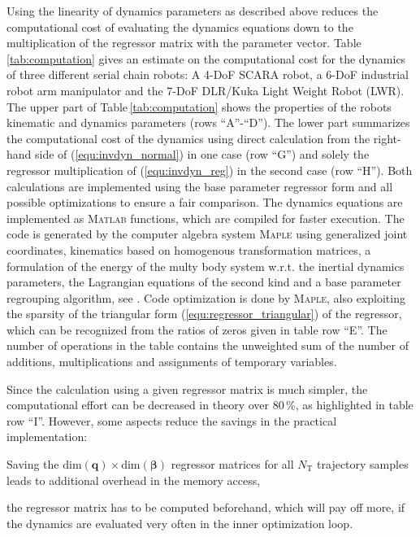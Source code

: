 \documentclass{svproc}
\newcommand{\bm}[1]{\boldsymbol{#1}}
\begin{document}
Using the linearity of dynamics parameters as described above reduces the computational cost of evaluating the dynamics equations down to the multiplication of the regressor matrix with the parameter vector.
Table\,\ref{tab:computation} gives an estimate on the computational cost for the dynamics of three different serial chain robots: A 4-DoF SCARA robot, a 6-DoF industrial robot arm manipulator and the 7-DoF DLR/Kuka Light Weight Robot (LWR).
The upper part of Table\,\ref{tab:computation} shows the properties of the robots kinematic and dynamics parameters (rows ``A''-``D'').
The lower part summarizes the computational cost of the dynamics using direct calculation from the right-hand side of (\ref{equ:invdyn_normal}) in one case (row ``G'') and solely the regressor multiplication of (\ref{equ:invdyn_reg}) in the second case (row ``H'').
Both calculations are implemented using the base parameter regressor form and all possible optimizations to ensure a fair comparison.
The dynamics equations are implemented as \textsc{Matlab} functions, which are compiled for faster execution.
The code is generated by the computer algebra system \textsc{Maple} using generalized joint coordinates, kinematics based on homogenous transformation matrices, a formulation of the energy of the multy body system w.r.t. the inertial dynamics parameters, the Lagrangian equations of the second kind and a base parameter regrouping algorithm, see \cite{KhalilDom2002}.
Code optimization is done by \textsc{Maple}, also exploiting the sparsity of the triangular form (\ref{equ:regressor_triangular}) of the regressor, which can be recognized from the ratios of zeros given in table row ``E''.
The number of operations in the table contains the unweighted sum of the number of additions, multiplications and assignments of temporary variables.

Since the calculation using a given regressor matrix is much simpler, the computational effort can be decreased in theory over 80\,\%, as highlighted in table row ``I''.
However, some aspects reduce the savings in the practical implementation:
\begin{compactitem} 
\item Saving the $\mathrm{dim}(\bm{q}) \times \mathrm{dim}(\bm{\beta})$ regressor matrices for all $N_\mathrm{T}$ trajectory samples leads to additional overhead in the memory access,
\item the regressor matrix has to be computed beforehand, which will pay off more, if the dynamics are evaluated very often in the inner optimization loop.
\end{compactitem}  
\end{document}
